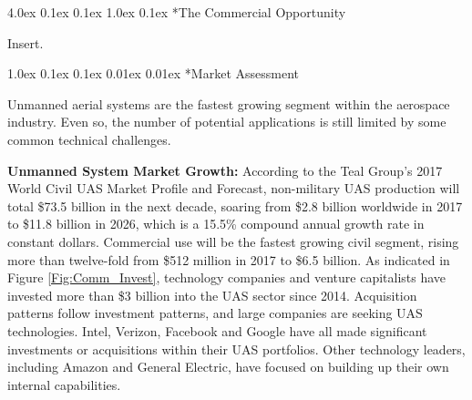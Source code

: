 \documentclass[11pt]{article}
\makeatletter
\renewcommand\section{
\@startsection{section}{1}{\z@}%
{4.0ex \@plus 0.1ex \@minus 0.1ex}%
{1.0ex \@plus 0.1ex}%
{\normalfont\LARGE\bfseries}}
\renewcommand\subsection{
\@startsection{subsection}{2}{\z@}%
{1.0ex \@plus 0.1ex \@minus 0.1ex}%
{0.01ex \@plus 0.01ex}%
{\normalfont\Large\bfseries}}
\makeatother
\begin{document}
\section*{The Commercial Opportunity}  %

Insert.




\subsection*{Market Assessment}

Unmanned aerial systems are the fastest growing segment within the aerospace industry.  Even so, the number of potential applications is still limited by some common technical challenges.


{\bf Unmanned System Market Growth:}
According to the Teal Group's 2017 World Civil UAS Market Profile and Forecast, non-military UAS production will total \$73.5 billion in the next decade, soaring from \$2.8 billion worldwide in 2017 to \$11.8 billion in 2026, which is a 15.5\% compound annual growth rate in constant dollars.  Commercial use will be the fastest growing civil segment, rising more than twelve-fold from \$512 million in 2017 to \$6.5 billion.  As indicated in Figure \ref{Fig:Comm_Invest}, technology companies and venture capitalists have invested more than \$3 billion into the UAS sector since 2014.  Acquisition patterns follow investment patterns, and large companies are seeking UAS technologies.  Intel, Verizon, Facebook and Google have all made significant investments or acquisitions within their UAS portfolios.  Other technology leaders, including Amazon and General Electric, have focused on building up their own internal capabilities.
\end{document}
